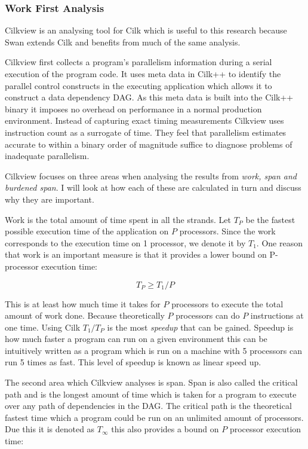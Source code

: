 \subsubsection{Work First Analysis}
\label{section:cilkview}

Cilkview is an analysing tool for Cilk which is useful to this research because Swan extends Cilk and benefits from much of the same analysis.

Cilkview first collects a program's parallelism information during a serial execution of the program code. It uses meta data in Cilk++ to identify the parallel control constructs in the executing application which allows it to construct a data dependency DAG. As this meta data is built into the Cilk++ binary it imposes no overhead on performance in a normal production environment. Instead of capturing exact timing measurements Cilkview uses instruction count as a surrogate of time. They feel that parallelism estimates accurate to within a binary order of magnitude suffice to diagnose problems of inadequate parallelism. 

Cilkview focuses on three areas when analysing the results from \emph{work, span and burdened span}. I will look at how each of these are calculated in turn and discuss why they are important. 

Work is the total amount of time spent in all the strands. Let \(T_P\) be the fastest possible execution time of the application on \(P\) processors. Since the work corresponds to the execution time on 1 processor, we denote it by \(T_1\). One reason that work is an important measure is that it provides a lower bound on P-processor execution time: 

\[T_P \geq T_1/P\]

This is at least how much time it takes for \(P\) processors to execute the total amount of work done. Because theoretically \(P\) processors can do \(P\) instructions at one time. Using Cilk \(T_1/T_P\) is the most \emph{speedup} that can be gained. Speedup is how much faster a program can run on a given environment this can be intuitively written as a program which is run on a machine with 5 processors can run 5 times as fast. This level of speedup is known as linear speed up.

The second area which Cilkview analyses is span. Span is also called the critical path and is the longest amount of time which is taken for a program to execute over any path of dependencies in the DAG. The critical path is the theoretical fastest time which a program could be run on an unlimited amount of processors. Due this it is denoted as \(T_\infty\) this also provides a bound on \(P\) processor execution time:


